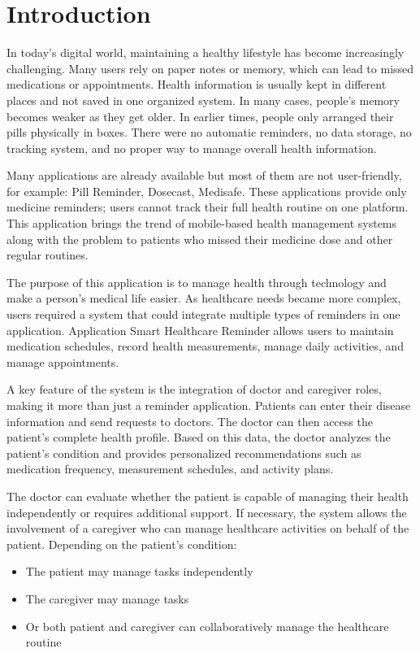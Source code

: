 \documentclass[12pt, a4paper, oneside]{report}
\begin{document}
\newpage
\tableofcontents
\newpage
\listoftables
\newpage
\listoffigures

\chapter{Introduction}
\label{ch:introduction}

In today's digital world, maintaining a healthy lifestyle has become increasingly challenging. Many users rely on paper notes or memory, which can lead to missed medications or appointments. Health information is usually kept in different places and not saved in one organized system. In many cases, people's memory becomes weaker as they get older. In earlier times, people only arranged their pills physically in boxes. There were no automatic reminders, no data storage, no tracking system, and no proper way to manage overall health information.

Many applications are already available but most of them are not user-friendly, for example: Pill Reminder, Dosecast, Medisafe. These applications provide only medicine reminders; users cannot track their full health routine on one platform. This application brings the trend of mobile-based health management systems along with the problem to patients who missed their medicine dose and other regular routines.

The purpose of this application is to manage health through technology and make a person's medical life easier. As healthcare needs became more complex, users required a system that could integrate multiple types of reminders in one application. Application Smart Healthcare Reminder allows users to maintain medication schedules, record health measurements, manage daily activities, and manage appointments.

A key feature of the system is the integration of doctor and caregiver roles, making it more than just a reminder application. Patients can enter their disease information and send requests to doctors. The doctor can then access the patient's complete health profile. Based on this data, the doctor analyzes the patient's condition and provides personalized recommendations such as medication frequency, measurement schedules, and activity plans.

The doctor can evaluate whether the patient is capable of managing their health independently or requires additional support. If necessary, the system allows the involvement of a caregiver who can manage healthcare activities on behalf of the patient. Depending on the patient's condition:
\begin{itemize}
    \item The patient may manage tasks independently
    \item The caregiver may manage tasks
    \item Or both patient and caregiver can collaboratively manage the healthcare routine
\end{itemize}
\end{document}
